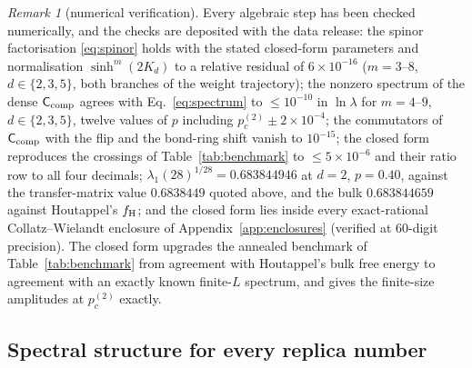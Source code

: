 \documentclass[aps,prx,reprint,superscriptaddress,nobibnotes,longbibliography]{revtex4-2}
\theoremstyle{remark}
\newtheorem{remark}{Remark}
\newcommand{\Ccomp}{\mathsf C_{\rm comp}}
\begin{document}
\begin{remark}[numerical verification]
\label{rem:verification}
Every algebraic step has been checked numerically, and the checks are deposited with the data release: the spinor factorisation \eqref{eq:spinor} holds with the stated closed-form parameters and normalisation $\sinh^m(2K_d)$ to a relative residual of $6\times10^{-16}$ ($m=3$--$8$, $d\in\{2,3,5\}$, both branches of the weight trajectory); the nonzero spectrum of the dense $\Ccomp$ agrees with Eq.~\eqref{eq:spectrum} to $\le10^{-10}$ in $\ln\lambda$ for $m=4$--$9$, $d\in\{2,3,5\}$, twelve values of $p$ including $p_c^{(2)}\pm2\times10^{-4}$; the commutators of $\Ccomp$ with the flip and the bond-ring shift vanish to $10^{-15}$; the closed form reproduces the crossings of Table~\ref{tab:benchmark} to $\le5\times10^{-6}$ and their ratio row to all four decimals; $\lambda_1(28)^{1/28}=0.683844946$ at $d=2$, $p=0.40$, against the transfer-matrix value $0.6838449$ quoted above, and the bulk $0.683844659$ against Houtappel's $f_{\rm H}$; and the closed form lies inside every exact-rational Collatz--Wielandt enclosure of Appendix~\ref{app:enclosures} (verified at $60$-digit precision).  The closed form upgrades the annealed benchmark of Table~\ref{tab:benchmark} from agreement with Houtappel's bulk free energy to agreement with an exactly known finite-$L$ spectrum, and gives the finite-size amplitudes at $p_c^{(2)}$ exactly.
\end{remark}

\subsection{Spectral structure for every replica number}
\label{sec:general-n}
\end{document}
